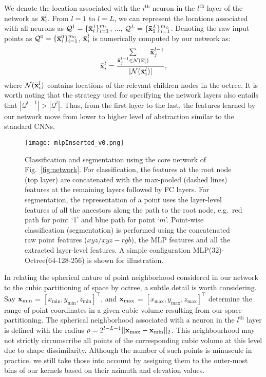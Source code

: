 \documentclass[10pt,twocolumn,letterpaper]{article}
\begin{document}
We denote the location associated with the $i^{\text{th}}$ neuron in the $l^{\text{th}}$ layer of the network as $\bold{\bar{x}}_i^l$. From $l =1$ to $l = L$, we can  represent the locations associated with all neurons as $\mathcal{Q}^1=\{\bold{\bar{x}}_i^1\}_{i=1}^{m_1}$, $\dots$, $\mathcal{Q}^L=\{\bold{\bar{x}}_1^L\}_{i = 1}^{m_L}$. Denoting the raw input points as $\mathcal{Q}^0=\{\bold{\bar{x}}_i^0\}_{i=1}^{m_0}$, $\bold{\bar{x}}_i^l$ is numerically computed by our network   as:
\vspace{-3mm}
\begin{align}\label{node-xyz}
  \bold{\bar{x}}^l_i = \frac{\sum\limits_{\bold{\bar{x}}_j^{l-1}\in \mathcal{N}(\bold{\bar{x}}^l_i)}\bold{\bar{x}}_j^{l-1}}{|\mathcal{N}(\bold{\bar{x}}^l_i)|},
  \end{align}
  where $\mathcal{N}(\bold{\bar{x}}_i^l)$ contains  locations of the relevant children nodes in the octree.  It is worth noting that the strategy used  for specifying the network layers also entails that $|\mathcal Q^{l-1}| > |\mathcal Q^l|$.  Thus, from the first layer to the last, the features learned by our network move from lower to higher level of abstraction similar to the standard CNNs.

\begin{figure*}[t]
  \centering
  \texttt{[image: mlpInserted\_v0.png]}
  \caption{Classification and segmentation using the core network of Fig.~\ref{fig:network}. For classification, the features at the root node (top layer) are concatenated with the max-pooled (dashed lines) features at the remaining layers followed by FC layers. For segmentation, the representation of a point uses the layer-level features of all the ancestors along the path to the root node, e.g.~red path for point `1' and blue path for point `$m$'.  Point-wise classification (segmentation) is performed using the concatenated raw point features ($xyz/xyz-rgb$), the MLP features and all the extracted layer-level features. A simple configuration MLP(32)-Octree(64-128-256) is shown for illustration.}
\label{fig:segNet}
  \vspace{-3mm}
\end{figure*}


In relating the spherical nature of point  neighborhood  considered in our network to  the cubic partitioning of  space by octree, a subtle detail is worth considering.
Say $\bold{x}_{\min}$ = $[x_{\min}, y_{\min}, z_{\min}]^{\intercal}$, and $\bold{x}_{\max}$ = $[x_{\max}, y_{\max}, z_{\max}]^{\intercal}$  determine the range of point coordinates in a given cubic volume resulting from our space partitioning.  The spherical neighborhood associated  with a  neuron in the $l^{\text{th}}$ layer is defined with  the radius $\rho=2^{l-L-1} || \bold{x}_{\max} -\bold{x}_{\min} ||_2$.  This neighbourhood may not strictly circumscribe all points of the corresponding cubic volume at this level due to shape dissimilarity. Although  the number of such points is minuscule in practice,  we still take those  into account by assigning them to the outer-most bins of our kernels based on their azimuth and elevation values.
\end{document}
